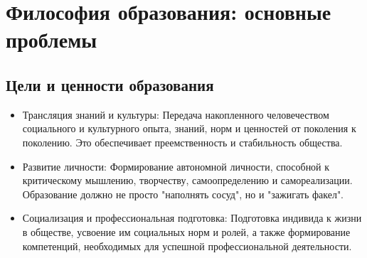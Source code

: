 \documentclass[12pt,a4paper]{article}
\begin{document}
	\section{Философия образования: основные проблемы~\checkmark}
	\subsection{Цели и ценности образования}
	\begin{itemize}
		\item Трансляция знаний и культуры: Передача накопленного человечеством социального и культурного опыта, знаний, норм и ценностей от поколения к поколению. Это обеспечивает преемственность и стабильность общества.
		\item Развитие личности: Формирование автономной личности, способной к критическому мышлению, творчеству, самоопределению и самореализации. Образование должно не просто "наполнять сосуд", но и "зажигать факел".
		\item Социализация и профессиональная подготовка: Подготовка индивида к жизни в обществе, усвоение им социальных норм и ролей, а также формирование компетенций, необходимых для успешной профессиональной деятельности.
	\end{itemize}
	
\end{document}
